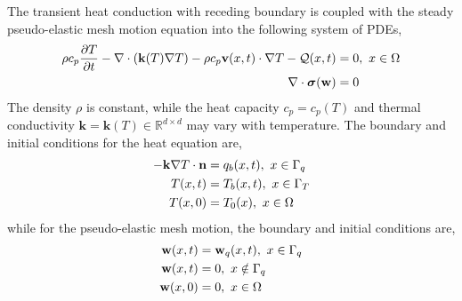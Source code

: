 The transient heat conduction with receding boundary is coupled with the steady pseudo-elastic mesh motion equation into the following system of PDEs,
\begin{subequations}
    \begin{align}
        \rho c_p\frac{\partial T}{\partial t} - \nabla\cdot (\mathbf{k}(T) \nabla T) - \rho c_p\mathbf{v}(x,t)\cdot\nabla T - \mathcal{Q}(x,t) &= 0,\ x\in\Omega \label{eqn_thermal_pde}\\
        \nabla\cdot\boldsymbol{\sigma}(\mathbf{w}) &= 0\label{eqn_elasticity_pde}
    \end{align}\label{eqn_governing_equations}
\end{subequations}
The density $\rho$ is constant, while the heat capacity $c_p=c_p(T)$ and thermal conductivity $\mathbf{k}=\mathbf{k}(T)\in\mathbb{R}^{d\times d}$ may vary with temperature. The boundary and initial conditions for the heat equation are,
\begin{subequations}
    \begin{align}
        -\mathbf{k}\nabla T\cdot \vn &= q_b(x,t),\ x\in\Gamma_q\label{eqn_thermal_bc_neumann}\\
        T(x,t) &= T_b(x,t),\ x\in\Gamma_T\label{eqn_thermal_bc_dirichlet}\\
        T(x,0) &= T_0(x),\ x\in\Omega\label{eqn_thermal_ic}
    \end{align}\label{eqn_thermal_bc}
\end{subequations}
while for the pseudo-elastic mesh motion, the boundary and initial conditions are,
\begin{subequations}
    \begin{align}
        \mathbf{w}(x,t) &= \mathbf{w}_q(x,t),\ x\in\Gamma_q\\
        \mathbf{w}(x,t) &= 0,\ x\notin\Gamma_q\\
        \mathbf{w}(x,0) &= 0,\ x\in\Omega
    \end{align}\label{eqn_elasticity_bc}
\end{subequations}

